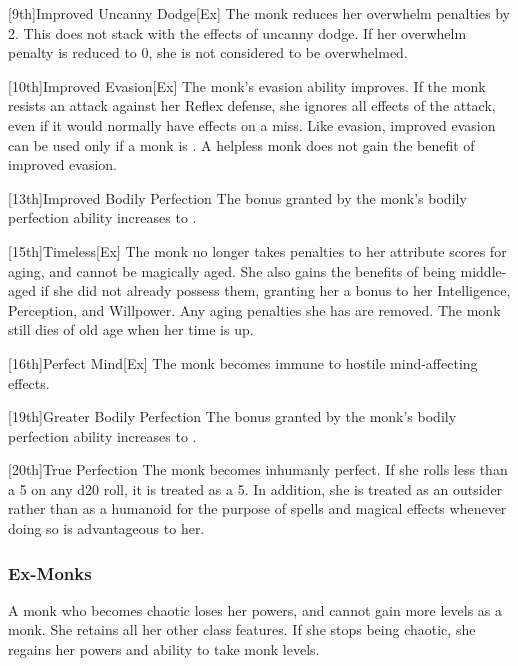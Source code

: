 [9th]{Improved Uncanny Dodge}[Ex]
The monk reduces her overwhelm penalties by 2.
This does not stack with the effects of uncanny dodge.
If her overwhelm penalty is reduced to 0, she is not considered to be overwhelmed.

[10th]{Improved Evasion}[Ex]
The monk's evasion ability improves.
If the monk resists an attack against her Reflex defense, she ignores all effects of the attack, even if it would normally have effects on a miss.
Like evasion, improved evasion can be used only if a monk is \unencumbered.
A helpless monk does not gain the benefit of improved evasion.

[13th]{Improved Bodily Perfection}
The bonus granted by the monk's bodily perfection ability increases to .

[15th]{Timeless}[Ex]
The monk no longer takes penalties to her attribute scores for aging, and cannot be magically aged.
She also gains the benefits of being middle-aged if she did not already possess them, granting her a  bonus to her Intelligence, Perception, and Willpower.
Any aging penalties she has are removed.
The monk still dies of old age when her time is up.

[16th]{Perfect Mind}[Ex]
The monk becomes immune to hostile mind-affecting effects.

[19th]{Greater Bodily Perfection}
The bonus granted by the monk's bodily perfection ability increases to .

[20th]{True Perfection}
The monk becomes inhumanly perfect.
If she rolls less than a 5 on any d20 roll, it is treated as a 5.
In addition, she is treated as an outsider rather than as a humanoid for the purpose of spells and magical effects whenever doing so is advantageous to her.

\subsubsection{Ex-Monks}
A monk who becomes chaotic loses her \ki powers, and cannot gain more levels as a monk.
She retains all her other class features.
If she stops being chaotic, she regains her \ki powers and ability to take monk levels.

